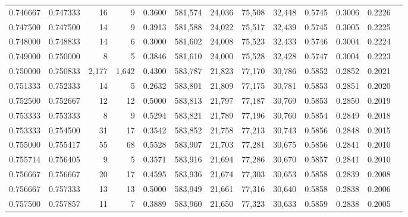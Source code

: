 \begin{tabular}{rrrrrrrrrrrrr}
0.746667 & 0.747333 &     16 &     9 &                                     0.3600 & 581,574 &  24,036 &  75,508 &  32,448 & 0.5745 & 0.3006 & 0.2226 \\
0.747500 & 0.747500 &     14 &     9 &                                     0.3913 & 581,588 &  24,022 &  75,517 &  32,439 & 0.5745 & 0.3005 & 0.2225 \\
0.748000 & 0.748833 &     14 &     6 &                                     0.3000 & 581,602 &  24,008 &  75,523 &  32,433 & 0.5746 & 0.3004 & 0.2224 \\
0.749000 & 0.750000 &      8 &     5 &                                     0.3846 & 581,610 &  24,000 &  75,528 &  32,428 & 0.5747 & 0.3004 & 0.2223 \\
0.750000 & 0.750833 &  2,177 & 1,642 &                                     0.4300 & 583,787 &  21,823 &  77,170 &  30,786 & 0.5852 & 0.2852 & 0.2021 \\
0.751333 & 0.752333 &     14 &     5 &                                     0.2632 & 583,801 &  21,809 &  77,175 &  30,781 & 0.5853 & 0.2851 & 0.2020 \\
0.752500 & 0.752667 &     12 &    12 &                                     0.5000 & 583,813 &  21,797 &  77,187 &  30,769 & 0.5853 & 0.2850 & 0.2019 \\
0.753333 & 0.753333 &      8 &     9 &                                     0.5294 & 583,821 &  21,789 &  77,196 &  30,760 & 0.5854 & 0.2849 & 0.2018 \\
0.753333 & 0.754500 &     31 &    17 &                                     0.3542 & 583,852 &  21,758 &  77,213 &  30,743 & 0.5856 & 0.2848 & 0.2015 \\
0.755000 & 0.755417 &     55 &    68 &                                     0.5528 & 583,907 &  21,703 &  77,281 &  30,675 & 0.5856 & 0.2841 & 0.2010 \\
0.755714 & 0.756405 &      9 &     5 &                                     0.3571 & 583,916 &  21,694 &  77,286 &  30,670 & 0.5857 & 0.2841 & 0.2010 \\
0.756667 & 0.756667 &     20 &    17 &                                     0.4595 & 583,936 &  21,674 &  77,303 &  30,653 & 0.5858 & 0.2839 & 0.2008 \\
0.756667 & 0.757333 &     13 &    13 &                                     0.5000 & 583,949 &  21,661 &  77,316 &  30,640 & 0.5858 & 0.2838 & 0.2006 \\
0.757500 & 0.757857 &     11 &     7 &                                     0.3889 & 583,960 &  21,650 &  77,323 &  30,633 & 0.5859 & 0.2838 & 0.2005 \\

\end{tabular}
